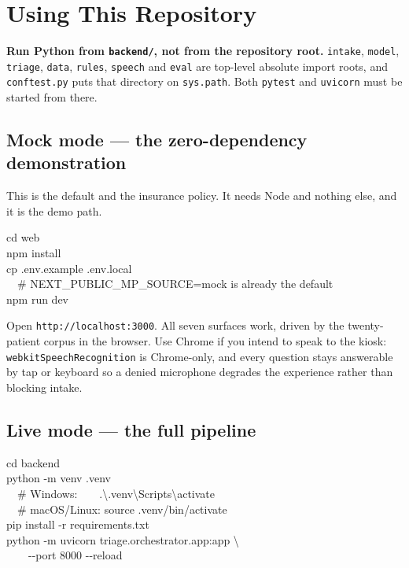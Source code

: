 \documentclass[10pt,a4paper,twocolumn]{article}
\newcommand{\pth}[1]{\textcolor{SecPurple}{\texttt{#1}}}
\newcommand{\cm}[1]{\texttt{#1}}
\begin{document}
\section{Using This Repository}
\label{sec:use}

\begin{tcolorbox}[mpwarn]
\textbf{Run Python from \pth{backend/}, not from the repository root.} \cm{intake}, \cm{model},
\cm{triage}, \cm{data}, \cm{rules}, \cm{speech} and \cm{eval} are top-level absolute import roots,
and \pth{conftest.py} puts that directory on \cm{sys.path}. Both \cm{pytest} and \cm{uvicorn} must
be started from there.
\end{tcolorbox}

\subsection{Mock mode --- the zero-dependency demonstration}
This is the default and the insurance policy. It needs Node and nothing else, and it is the demo
path.

\begin{tcolorbox}[mpcode]
cd web\\
npm install\\
cp .env.example .env.local\\
\ \ \# NEXT\_PUBLIC\_MP\_SOURCE=mock is already the default\\
npm run dev
\end{tcolorbox}

\noindent Open \cm{http://localhost:3000}. All seven surfaces work, driven by the twenty-patient
corpus in the browser. Use Chrome if you intend to speak to the kiosk:
\cm{webkitSpeechRecognition} is Chrome-only, and every question stays answerable by tap or keyboard
so a denied microphone degrades the experience rather than blocking intake.

\subsection{Live mode --- the full pipeline}
\begin{tcolorbox}[mpcode]
cd backend\\
python -m venv .venv\\
\ \ \# Windows:\ \ \ \ .\textbackslash.venv\textbackslash Scripts\textbackslash activate\\
\ \ \# macOS/Linux: source .venv/bin/activate\\
pip install -r requirements.txt\\
python -m uvicorn triage.orchestrator.app:app \textbackslash\\
\ \ \ \ -{}-port 8000 -{}-reload
\end{tcolorbox}
\end{document}
